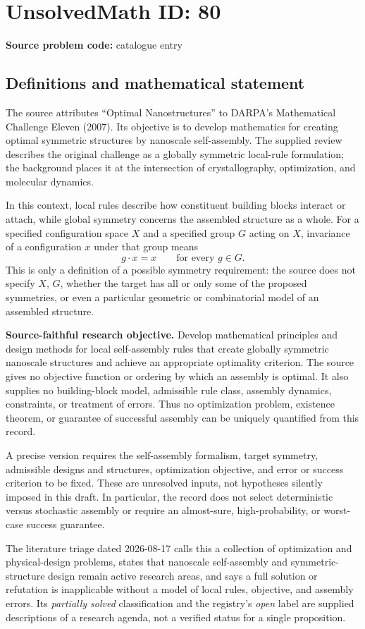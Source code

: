 \documentclass[11pt]{article}
\begin{document}
\section*{UnsolvedMath ID: 80}
\textbf{Source problem code:} catalogue entry
\subsection{Definitions and mathematical statement}
The source attributes ``Optimal Nanostructures'' to DARPA's Mathematical Challenge Eleven (2007). Its objective is to develop mathematics for creating optimal symmetric structures by nanoscale self-assembly. The supplied review describes the original challenge as a globally symmetric local-rule formulation; the background places it at the intersection of crystallography, optimization, and molecular dynamics.

In this context, local rules describe how constituent building blocks interact or attach, while global symmetry concerns the assembled structure as a whole. For a specified configuration space $X$ and a specified group $G$ acting on $X$, invariance of a configuration $x$ under that group means
\[
 g\cdot x=x\qquad\text{for every }g\in G.
\]
This is only a definition of a possible symmetry requirement: the source does not specify $X$, $G$, whether the target has all or only some of the proposed symmetries, or even a particular geometric or combinatorial model of an assembled structure.

\textbf{Source-faithful research objective.} Develop mathematical principles and design methods for local self-assembly rules that create globally symmetric nanoscale structures and achieve an appropriate optimality criterion. The source gives no objective function or ordering by which an assembly is optimal. It also supplies no building-block model, admissible rule class, assembly dynamics, constraints, or treatment of errors. Thus no optimization problem, existence theorem, or guarantee of successful assembly can be uniquely quantified from this record.

A precise version requires the self-assembly formalism, target symmetry, admissible designs and structures, optimization objective, and error or success criterion to be fixed. These are unresolved inputs, not hypotheses silently imposed in this draft. In particular, the record does not select deterministic versus stochastic assembly or require an almost-sure, high-probability, or worst-case success guarantee.

The literature triage dated 2026-08-17 calls this a collection of optimization and physical-design problems, states that nanoscale self-assembly and symmetric-structure design remain active research areas, and says a full solution or refutation is inapplicable without a model of local rules, objective, and assembly errors. Its \emph{partially solved} classification and the registry's \emph{open} label are supplied descriptions of a research agenda, not a verified status for a single proposition.
\end{document}
